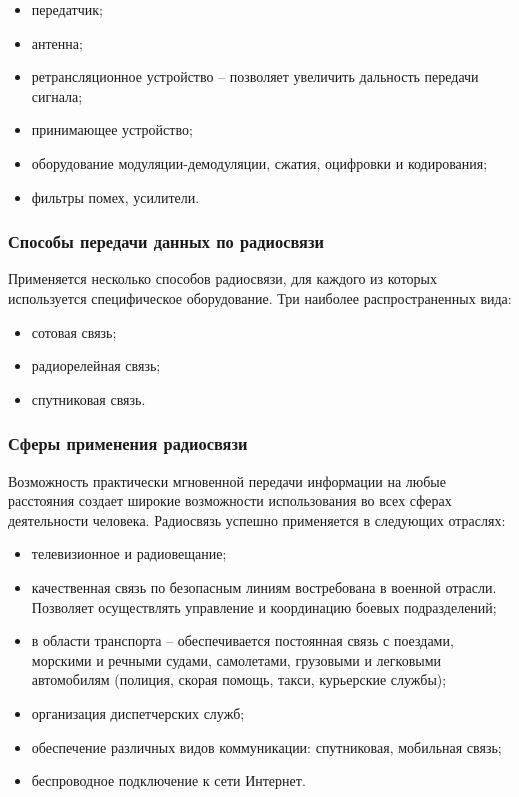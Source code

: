 \documentclass[a4paper]{report}
\begin{document}
\begin{itemize}
\item передатчик;
\item антенна;
\item ретрансляционное устройство – позволяет увеличить дальность передачи сигнала;
\item принимающее устройство;
\item оборудование модуляции-демодуляции, сжатия, оцифровки и кодирования;
\item фильтры помех, усилители.
\end{itemize}

\subsubsection{Способы передачи данных по радиосвязи}
Применяется несколько способов радиосвязи, для каждого из которых используется специфическое оборудование. Три наиболее распространенных вида:
\begin{itemize}
\item сотовая связь;
\item радиорелейная связь;
\item спутниковая связь.
\end{itemize}


\subsubsection{Сферы применения радиосвязи}

Возможность практически мгновенной передачи информации на любые расстояния создает широкие возможности использования во всех сферах деятельности человека. Радиосвязь успешно применяется в следующих отраслях:

\begin{itemize}
\item телевизионное и радиовещание;
\item качественная связь по безопасным линиям востребована в военной отрасли. Позволяет осуществлять управление и координацию боевых подразделений;
\item в области транспорта – обеспечивается постоянная связь с поездами, морскими и речными судами, самолетами, грузовыми и легковыми автомобилям (полиция, скорая помощь, такси, курьерские службы);
\item организация диспетчерских служб;
\item обеспечение различных видов коммуникации: спутниковая, мобильная связь;
\item беспроводное подключение к сети Интернет.
\end{itemize}
\end{document}
